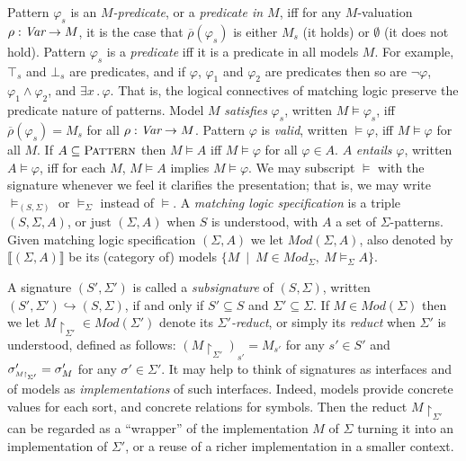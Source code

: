 \documentclass[UTF8,11pt]{article}
\theoremstyle{plain}
\theoremstyle{definition}
\theoremstyle{remark}
\newcommand{\Mod}{\textit{Mod}}
\newcommand{\denote}[1]{\llbracket{#1}\rrbracket}
\newcommand{\reduct}[2]{\mbox{${#1}\!\!\upharpoonright_{#2}$}}
\newcommand{\reductscript}[2]{\mbox{\tiny${#1}\!\!\upharpoonright_{#2}$}}
\newcommand{\Pattern}{\textsc{Pattern}\xspace}
\begin{document}
Pattern $\varphi_s$ is an \emph{$M$-predicate}, or a
\emph{predicate in $M$}, iff for any $M$-valuation $\rho:\textit{Var}\rightarrow M$,
it is the case that $\overline{\rho}(\varphi_s)$ is either $M_s$ (it holds) or
$\emptyset$ (it does not hold).
Pattern $\varphi_s$ is a \emph{predicate} iff it is a predicate in all
models $M$.
For example, $\top_s$ and $\bot_s$ are predicates, and if $\varphi$,
$\varphi_1$ and $\varphi_2$ are predicates then so are $\neg\varphi$,
$\varphi_1 \wedge \varphi_2$, and $\exists x\,.\,\varphi$.
That is, the logical connectives of matching logic preserve the predicate
nature of patterns.
Model $M$ \emph{satisfies} $\varphi_s$, written ${M}\models \varphi_s$, iff
$\overline{\rho}(\varphi_s) = M_s$ for all $\rho:\textit{Var}\rightarrow M$.
Pattern $\varphi$ is \emph{valid}, written $\models \varphi$,
iff ${M} \models \varphi$ for all ${M}$.
If $A\subseteq\Pattern$ then ${M} \models A$ iff
${M} \models \varphi$ for all $\varphi\in A$.
$A$ \emph{entails} $\varphi$, written $A \models \varphi$,
iff for each ${M}$, ${M} \models A$ implies ${M} \models \varphi$.
We may subscript $\models$ with the signature whenever we feel it
clarifies the presentation; that is, we may write $\models_{(S,\Sigma)}$ or
$\models_\Sigma$ instead of $\models$.
A \emph{matching logic specification} is a triple $(S,\Sigma,A)$, or
just $(\Sigma,A)$ when $S$ is understood, with $A$ a set of $\Sigma$-patterns.
Given matching logic specification $(\Sigma,A)$ we let
$\Mod(\Sigma,A)$, also denoted by $\denote{(\Sigma,A)}$ be its (category of)
models $\{M \ \mid \ M \in \Mod_{\Sigma},\ M \models_{\Sigma} A \}$.

A signature $(S',\Sigma')$ is called a \emph{subsignature} of $(S,\Sigma)$, written
$(S',\Sigma') \hookrightarrow(S,\Sigma)$, if and only if $S' \subseteq S$ and
$\Sigma' \subseteq \Sigma$.
If $M \in \Mod(\Sigma)$ then we let
$\reduct{M}{\Sigma'} \in \Mod(\Sigma')$ denote its
\emph{$\Sigma'$-reduct}, or simply its \emph{reduct} when
$\Sigma'$ is understood, defined as follows:
$(\reduct{M}{\Sigma'})_{s'} = M_{s'}$ for any $s'\in S'$ and
$\sigma'_{\reductscript{M}{\Sigma'}} = \sigma'_M$ for any $\sigma'\in\Sigma'$.
It may help to think of signatures as interfaces and of models as
\emph{implementations} of such interfaces.
Indeed, models provide concrete values for each sort, and concrete relations
for symbols.
Then the reduct $\reduct{M}{\Sigma'}$ can be regarded as a ``wrapper'' of
the implementation $M$ of $\Sigma$ turning it into an implementation of
$\Sigma'$, or a reuse of a richer implementation in a smaller context.
\end{document}
